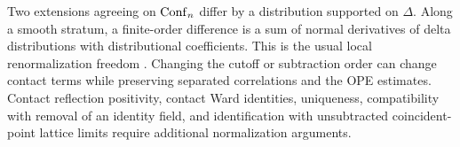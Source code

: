 Two extensions agreeing on $\operatorname{Conf}_n$ differ by a distribution supported
on $\Delta$. Along a smooth stratum, a finite-order difference is a sum
of normal derivatives of delta distributions with distributional
coefficients. This is the usual local renormalization freedom
\cite[Section~5.2]{BrunettiFredenhagen2000}. Changing the cutoff or
subtraction order can change contact terms while preserving separated
correlations and the OPE estimates. Contact reflection positivity,
contact Ward identities, uniqueness, compatibility with removal of an identity field, and identification
with unsubtracted coincident-point lattice limits require additional
normalization arguments.

